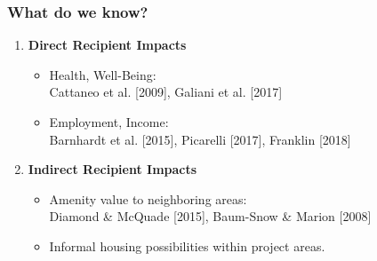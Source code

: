 \documentclass[aspectratio=32]{beamer}
\begin{document}

\begin{frame}
\frametitle{What do we know?}
\centering

\begin{enumerate}
  \item<1-> {\bf Direct Recipient Impacts}
  \vspace{2mm}
  \begin{itemize}
      \item {Health, Well-Being}: \\ Cattaneo et al. [2009], Galiani et al. [2017]
      \vspace{2mm}
      \item {Employment, Income}: \\ Barnhardt et al. [2015], Picarelli [2017], Franklin [2018]
    \end{itemize}
  \vspace{2mm}
  \item<2-> {\bf Indirect Recipient Impacts}
  \begin{itemize}
  \vspace{2mm}
      \item Amenity value to neighboring areas: \\ Diamond \& McQuade [2015], Baum-Snow \& Marion [2008]
      \item<3-> Informal housing possibilities within project areas.
      \vspace{2mm}
    \end{itemize}
\end{enumerate}

\end{frame}

\end{document}
